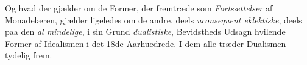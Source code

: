  \setcounter{footnote}{0}
Og hvad der gjælder om de Former, der fremtræde som
\emph{Fortsættelser} af Monadelæren, gjælder ligeledes om de
andre, deels \emph{uconsequent eklektiske}, deels paa den \emph{al\-%
mindelige}, i sin Grund \emph{dualistiske}, Bevidstheds Udsagn
hvilende Former af Idealismen i det 18de Aarhuedrede. I dem
alle træder Dualismen tydelig frem.

